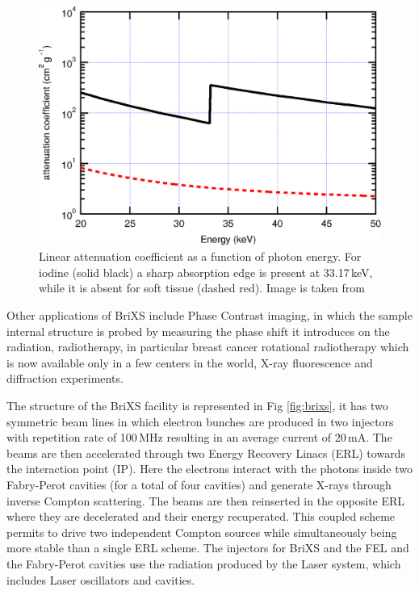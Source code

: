 \begin{figure}
	\centering
	\includegraphics[width=0.9\linewidth]{images/iodine.eps}
	\caption{Linear attenuation coefficient as a function of photon energy. For iodine (solid black) a sharp absorption edge is present at 33.17\,keV, while it is absent for soft tissue (dashed red). Image is taken from \parencite{CDR}}
	\label{fig:iodine}
\end{figure}

Other applications of BriXS include Phase Contrast imaging, in which the sample internal structure is probed by measuring the phase shift it introduces on the radiation, radiotherapy, in particular breast cancer rotational radiotherapy which is now available only in a few centers in the world, X-ray fluorescence and diffraction experiments.

The structure of the BriXS facility is represented in Fig \ref{fig:brixs}, it has two symmetric beam lines in which electron bunches are produced in two injectors with repetition rate of 100\,MHz resulting in an average current of 20\,mA. The beams are then accelerated through two Energy Recovery Linacs (ERL) towards the interaction point (IP). Here the electrons interact with the photons inside two Fabry-Perot cavities (for a total of four cavities) and generate X-rays through inverse Compton scattering. The beams are then reinserted in the opposite ERL where they are decelerated and their energy recuperated. This coupled scheme permits to drive two independent Compton sources while simultaneously being more stable than a single ERL scheme.
The injectors for BriXS and the FEL and the Fabry-Perot cavities use the radiation produced by the Laser system, which includes Laser oscillators and cavities.

